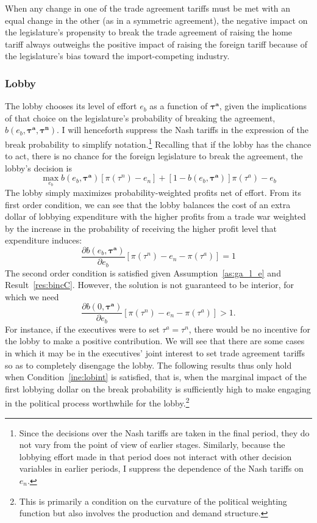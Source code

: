 \documentclass[10pt]{article}
\newcommand{\bta}{\bm{\tau^a}}
\newcommand{\btn}{\bm{\tau^n}}
\begin{document}
\noindent When any change in one of the trade agreement tariffs must be met with an equal change in the other (as in a symmetric agreement), the negative impact on the legislature's propensity to break the trade agreement of raising the home tariff always outweighs the positive impact of raising the foreign tariff because of the legislature's bias toward the import-competing industry.

\subsubsection{Lobby}
\label{sec:lob_un}
The lobby chooses its level of effort $e_b$ as a function of $\bta$, given the implications of that choice on the legislature's probability of breaking the agreement, $b(e_b,\bta,\btn)$. I will henceforth suppress the Nash tariffs in the expression of the break probability to simplify notation.\footnote{Since the decisions over the Nash tariffs are taken in the final period, they do not vary from the point of view of earlier stages. Similarly, because the lobbying effort made in that period does not interact with other decision variables in earlier periods, I suppress the dependence of the Nash tariffs on $e_n$.} Recalling that if the lobby has the chance to act, there is no chance for the foreign legislature to break the agreement, the lobby's decision is
\[
  \max_{e_b} b(e_b,\bta) \left[\pi(\tau^n) - e_n \right] + [1 - b(e_b,\bta)] \pi(\tau^a) - e_b
\]
The lobby simply maximizes probability-weighted profits net of effort. From its first order condition, we can see that the lobby balances the cost of an extra dollar of lobbying expenditure with the higher profits from a trade war weighted by the increase in the probability of receiving the higher profit level that expenditure induces:
\begin{equation}
	\frac{\partial b(e_b,\bta)}{\partial e_b} \left[ \pi(\tau^n) -e_n - \pi(\tau^a) \right] = 1 
	\label{eq:lobbyfoc}
\end{equation}
The second order condition is satisfied given Assumption~\ref{as:ga_l_e} and Result~\ref{res:bincC}. However, the solution is not guaranteed to be interior, for which we need
  \begin{equation}
	  \frac{\partial b(0,\bta)}{\partial e_b} \left[ \pi(\tau^n) -e_n- \pi(\tau^a) \right] > 1.
		\label{ine:lobint}	
  \end{equation}
For instance, if the executives were to set $\tau^a = \tau^n$, there would be no incentive for the lobby to make a positive contribution. We will see that there are some cases in which it may be in the executives' joint interest to set trade agreement tariffs so as to completely disengage the lobby. The following results thus only hold when Condition~\ref{ine:lobint} is satisfied, that is, when the marginal impact of the first lobbying dollar on the break probability is sufficiently high to make engaging in the political process worthwhile for the lobby.\footnote{This is primarily a condition on the curvature of the political weighting function but also involves the production and demand structure.}
  
\end{document}
